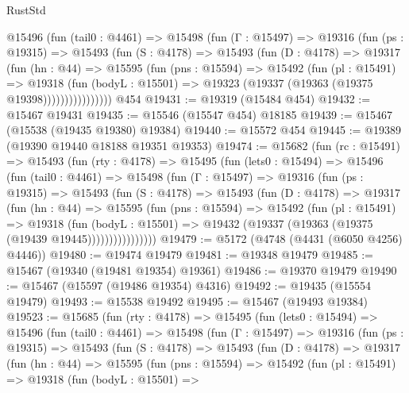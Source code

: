 \begin{lexlean}{RustStd}
\begin{coremodule}
          @15496
            (fun (tail0 : @4461) =>
            @15498
              (fun (Γ : @15497) =>
              @19316
                (fun (ps : @19315) =>
                @15493
                  (fun (S : @4178) =>
                  @15493
                    (fun (D : @4178) =>
                    @19317
                      (fun (hn : @44) =>
                      @15595
                        (fun (pns : @15594) =>
                        @15492
                          (fun (pl : @15491) =>
                          @19318
                            (fun (bodyL : @15501) =>
                            @19323 (@19337 (@19363 (@19375 @19398))))))))))))))))
    @454
@19431 := @19319 (@15484 @454)
@19432 := @15467 @19431
@19435 := @15546 (@15547 @454) @18185
@19439 := @15467 (@15538 (@19435 @19380) @19384)
@19440 := @15572 @454
@19445 := @19389 (@19390 @19440 @18188 @19351 @19353)
@19474 := @15682
    (fun (rc : @15491) =>
    @15493
      (fun (rty : @4178) =>
      @15495
        (fun (lets0 : @15494) =>
        @15496
          (fun (tail0 : @4461) =>
          @15498
            (fun (Γ : @15497) =>
            @19316
              (fun (ps : @19315) =>
              @15493
                (fun (S : @4178) =>
                @15493
                  (fun (D : @4178) =>
                  @19317
                    (fun (hn : @44) =>
                    @15595
                      (fun (pns : @15594) =>
                      @15492
                        (fun (pl : @15491) =>
                        @19318
                          (fun (bodyL : @15501) =>
                          @19432 (@19337 (@19363 (@19375 (@19439 @19445))))))))))))))))
@19479 := @5172 (@4748 (@4431 (@6050 @4256) @4446))
@19480 := @19474 @19479
@19481 := @19348 @19479
@19485 := @15467 (@19340 (@19481 @19354) @19361)
@19486 := @19370 @19479
@19490 := @15467 (@15597 (@19486 @19354) @4316)
@19492 := @19435 (@15554 @19479)
@19493 := @15538 @19492
@19495 := @15467 (@19493 @19384)
@19523 := @15685
    (fun (rty : @4178) =>
    @15495
      (fun (lets0 : @15494) =>
      @15496
        (fun (tail0 : @4461) =>
        @15498
          (fun (Γ : @15497) =>
          @19316
            (fun (ps : @19315) =>
            @15493
              (fun (S : @4178) =>
              @15493
                (fun (D : @4178) =>
                @19317
                  (fun (hn : @44) =>
                  @15595
                    (fun (pns : @15594) =>
                    @15492
                      (fun (pl : @15491) =>
                      @19318
                        (fun (bodyL : @15501) =>

\end{coremodule}
\end{lexlean}
